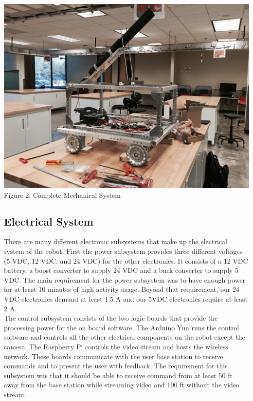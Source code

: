 \documentclass[letterpaper,12pt]{article}
\begin{document}
\begin{center}
    \includegraphics[width=15cm]{./pics/chassis/robot.jpg}
    Figure 2: Complete Mechanical System
\end{center}

\subsection{Electrical System}
There are many different electronic subsystems that make up the electrical
system of the robot. First the power subsystem provides three different
voltages (5 VDC,  12 VDC, and 24 VDC) for the other electronics. It consists of
a 12 VDC battery, a boost converter to supply 24 VDC and a buck converter to
supply 5 VDC. The main requirement for the power subsystem was to have enough
power for at least 10 minutes of high activity usage. Beyond that requirement,
our 24 VDC electronics demand at least 1.5 A and our 5VDC electronics require
at least 2 A.\\

The control subsystem consists of the two logic boards that provide the
processing power for the on board software. The Arduino Yun runs the control
software and controls all the other electrical components on the robot except
the camera. The Raspberry Pi controls the video stream and hosts the wireless
network. These boards communicate with the user base station to receive
commands and to present the user with feedback. The requirement for this
subsystem was that it should be able to receive command from at least 50 ft
away from the base station while streaming video and 100 ft without the video
stream.\\
\end{document}
